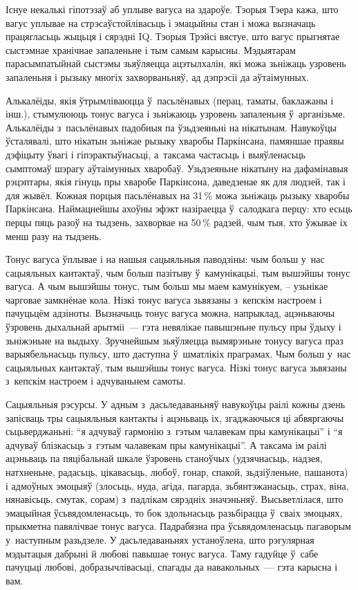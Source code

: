 Існуе некалькі гіпотэзаў аб уплыве вагуса на здароўе. Тэорыя Тэера кажа, што вагус уплывае на стрэсаўстойлівасьць і эмацыйны стан і можа вызначаць працягласьць жыцьця і сярэдні IQ. Тэорыя Трэйсі вястуе, што вагус прыгнятае сыстэмнае хранічнае запаленьне і тым самым карысны. Мэдыятарам парасымпатыйнай сыстэмы зьяўляецца ацэтылхалін, які можа зьніжаць узровень запаленьня і рызыку многіх захворваньняў, ад дэпрэсіі да аўтаімунных.

Алькалёіды, якія ўтрымліваюцца ў~пасьлёнавых (перац, таматы, баклажаны і інш.), стымулююць тонус вагуса і зьніжаюць узровень запаленьня ў~арганізьме. Алькалёіды з~пасьлёнавых падобныя па ўзьдзеяньні на нікатынам. Навукоўцы ўсталявалі, што нікатын зьніжае рызыку хваробы Паркінсана, памяншае праявы дэфіцыту ўвагі і гіпэрактыўнасьці, а~таксама частасьць і выяўленасьць сымптомаў шэрагу аўтаімунных хваробаў. Узьдзеяньне нікатыну на дафамінавыя рэцэптары, якія гінуць пры хваробе Паркінсона, даведзенае як для людзей, так і для жывёл. Кожная порцыя пасьлёнавых на 31\,\% можа зьніжаць рызыку хваробы Паркінсана. Наймацнейшы ахоўны эфэкт назіраецца ў~салодкага перцу: хто есьць перцы пяць разоў на тыдзень, захворвае на 50\,\% радзей, чым тыя, хто ўжывае іх менш разу на тыдзень.

Тонус вагуса ўплывае і на нашыя сацыяльныя паводзіны: чым больш у~нас сацыяльных кантактаў, чым больш пазітыву ў~камунікацыі, тым вышэйшы тонус вагуса. А чым вышэйшы тонус, тым больш мы маем камунікуем, -- узьнікае чарговае замкнёнае кола. Нізкі тонус вагуса зьвязаны з~кепскім настроем і пачуцьцём адзіноты. Вызначыць тонус вагуса можна, напрыклад, ацэньваючы ўзровень дыхальнай арытміі~--- гэта невялікае павышэньне пульсу пры ўдыху і зьніжэньне на выдыху. Зручнейшым зьяўляецца вымярэньне тонусу вагуса праз варыябельнасьць пульсу, што даступна ў~шматлікіх праграмах. Чым больш у~нас сацыяльных кантактаў, тым вышэйшы тонус вагуса. Нізкі тонус вагуса зьвязаны з~кепскім настроем і адчуваньнем самоты.

Сацыяльныя рэсурсы. У адным з~дасьледаваньняў навукоўцы раілі кожны дзень запісваць тры сацыяльныя кантакты і ацэньваць іх, згаджаючыся ці абвяргаючы сьцьверджаньні: ``я адчуваў гармонію з~гэтым чалавекам пры камунікацыі'' і ``я адчуваў блізкасьць з~гэтым чалавекам пры камунікацыі''. А таксама ім раілі ацэньваць па пяцібальнай шкале ўзровень станоўчых (удзячнасьць, надзея, натхненьне, радасьць, цікавасьць, любоў, гонар, спакой, зьдзіўленьне, пашанота) і адмоўных эмоцыяў (злосьць, нуда, агіда, пагарда, зьбянтэжанасьць, страх, віна, нянавісьць, смутак, сорам) з~падлікам сярэдніх значэньняў. Высьветлілася, што эмацыйная ўсьвядомленасьць, то бок здольнасьць разьбірацца ў~сваіх эмоцыях, прыкметна павялічвае тонус вагуса. Падрабязна пра ўсьвядомленасьць пагаворым у~наступным разьдзеле. У дасьледаваньнях устаноўлена, што рэгулярная мэдытацыя дабрыні й любові павышае тонус вагуса. Таму гадуйце ў~сабе пачуцьці любові, добразычлівасьці, спагады да навакольных~--- гэта карысна і вам.

